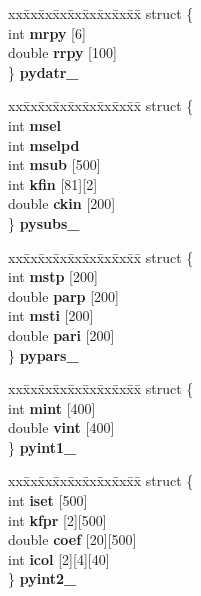 \begin{CompactItemize}
\begin{tabbing}
\end{tabbing}\item 
\begin{tabbing}
xx\=xx\=xx\=xx\=xx\=xx\=xx\=xx\=xx\=\kill
struct \{\\
\>int {\bf mrpy} [6]\\
\>double {\bf rrpy} [100]\\
\} {\bf pydatr\_}\\

\end{tabbing}\item 
\begin{tabbing}
xx\=xx\=xx\=xx\=xx\=xx\=xx\=xx\=xx\=\kill
struct \{\\
\>int {\bf msel}\\
\>int {\bf mselpd}\\
\>int {\bf msub} [500]\\
\>int {\bf kfin} [81][2]\\
\>double {\bf ckin} [200]\\
\} {\bf pysubs\_}\\

\end{tabbing}\item 
\begin{tabbing}
xx\=xx\=xx\=xx\=xx\=xx\=xx\=xx\=xx\=\kill
struct \{\\
\>int {\bf mstp} [200]\\
\>double {\bf parp} [200]\\
\>int {\bf msti} [200]\\
\>double {\bf pari} [200]\\
\} {\bf pypars\_}\\

\end{tabbing}\item 
\begin{tabbing}
xx\=xx\=xx\=xx\=xx\=xx\=xx\=xx\=xx\=\kill
struct \{\\
\>int {\bf mint} [400]\\
\>double {\bf vint} [400]\\
\} {\bf pyint1\_}\\

\end{tabbing}\item 
\begin{tabbing}
xx\=xx\=xx\=xx\=xx\=xx\=xx\=xx\=xx\=\kill
struct \{\\
\>int {\bf iset} [500]\\
\>int {\bf kfpr} [2][500]\\
\>double {\bf coef} [20][500]\\
\>int {\bf icol} [2][4][40]\\
\} {\bf pyint2\_}\\


\end{tabbing}
\end{CompactItemize}
